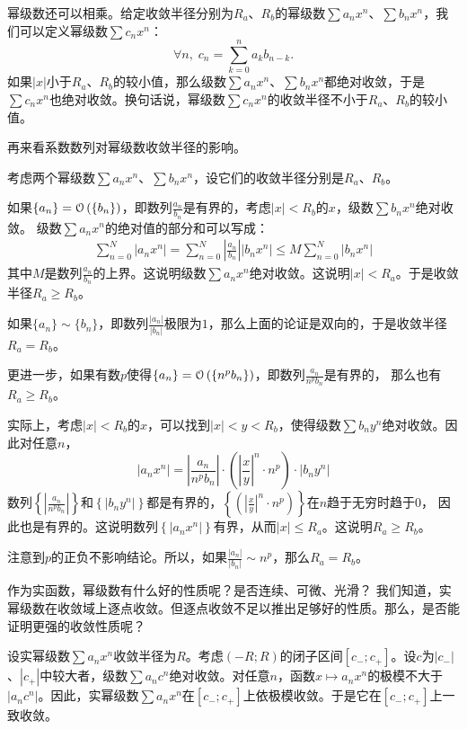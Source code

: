 \documentclass[12pt,UTF8]{ctexbook}
\begin{document}
\begin{appendix}
幂级数还可以相乘。给定收敛半径分别为$R_a$、$R_b$的幂级数$\sum a_n x^n$、$\sum b_n x^n$，我们可以定义幂级数$\sum c_n x^n$：
$$ \forall n, \; c_n = \sum_{k=0}^n a_k b_{n-k}.$$
如果$|x|$小于$R_a$、$R_b$的较小值，那么级数$\sum a_n x^n$、$\sum b_n x^n$都绝对收敛，于是$\sum c_n x^n$也绝对收敛。换句话说，幂级数$\sum c_n x^n$的收敛半径不小于$R_a$、$R_b$的较小值。

再来看系数数列对幂级数收敛半径的影响。

考虑两个幂级数$\sum a_n x^n$、$\sum b_n x^n$，设它们的收敛半径分别是$R_a$、$R_b$。

如果$\{a_n\} = \mathcal{O}\left(\{b_n\}\right)$，即数列$\frac{a_n}{b_n}$是有界的，考虑$|x|<R_b$的$x$，级数$\sum b_n x^n$绝对收敛。
级数$\sum a_n x^n$的绝对值的部分和可以写成：
\begin{align*}
    \sum_{n=0}^{N} |a_n x^n| = \sum_{n=0}^{N} \left|\frac{a_n}{b_n}\right| |b_n x^n| \leqslant M \sum_{n=0}^{N} |b_n x^n|
\end{align*}
其中$M$是数列$\frac{a_n}{b_n}$的上界。这说明级数$\sum a_n x^n$绝对收敛。这说明$|x|<R_a$。于是收敛半径$R_a \geqslant R_b$。

如果$\{a_n\} \sim \{b_n\}$，即数列$\frac{|a_n|}{|b_n|}$极限为$1$，那么上面的论证是双向的，于是收敛半径$R_a = R_b$。

更进一步，如果有数$p$使得$\{a_n\} = \mathcal{O}\left(\{n^p b_n\}\right)$，即数列$\displaystyle\frac{a_n}{n^p  b_n}$是有界的，
那么也有$R_a \geqslant R_b$。

实际上，考虑$|x|<R_b$的$x$，可以找到$|x|<y<R_b$，使得级数$\sum b_n y^n$绝对收敛。因此对任意$n$，
$$ |a_n x^n| = \left|\frac{a_n}{n^p  b_n} \right| \cdot \left(\left| \frac{x}{y}\right|^n \cdot n^p\right) \cdot |b_n y^n| $$
数列$\left\{\left|\frac{a_n}{n^p  b_n} \right|\right\}$和$\left\{|b_n y^n|\right\}$都是有界的，$\left\{\left(\left| \frac{x}{y}\right|^n \cdot n^p\right)\right\}$在$n$趋于无穷时趋于$0$，
因此也是有界的。这说明数列$\left\{|a_n x^n|\right\}$有界，从而$|x|\leqslant R_a$。这说明$R_a\geqslant R_b$。

注意到$p$的正负不影响结论。所以，如果$\frac{|a_n|}{|b_n|} \sim n^p$，那么$R_a = R_b$。

作为实函数，幂级数有什么好的性质呢？是否连续、可微、光滑？
我们知道，实幂级数在收敛域上逐点收敛。但逐点收敛不足以推出足够好的性质。那么，是否能证明更强的收敛性质呢？

设实幂级数$\sum a_n x^n$收敛半径为$R$。考虑$(-R;R)$的闭子区间$[c_-;c_+]$。设$c$为$|c_-|$、$|c_+|$中较大者，级数$\sum a_n c^n$绝对收敛。对任意$n$，函数$x\mapsto a_n x^n$的极模不大于$|a_n c^n|$。因此，实幂级数$\sum a_n x^n$在$[c_-;c_+]$上依极模收敛。于是它在$[c_-;c_+]$上一致收敛。


\end{appendix}
\end{document}
